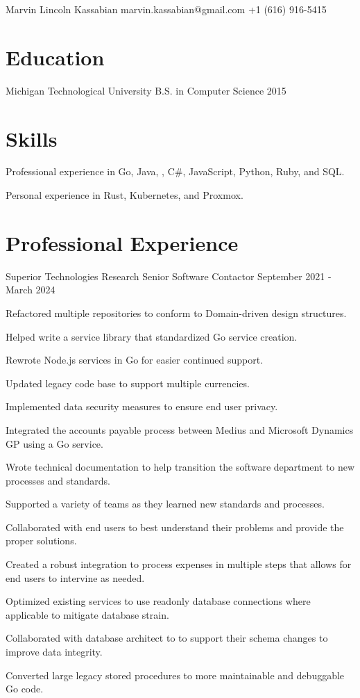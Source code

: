 \documentclass{marvinkassabian_resume}
\begin{document}
	\resumeheadersimple
			{Marvin Lincoln Kassabian}
			{marvin.kassabian@gmail.com}
			{+1 (616) 916-5415}

	\section{Education}
		\subsectionlocationdate
				{Michigan Technological University}
				{B.S. in Computer Science}
				{2015}

	\section{Skills}

		\resumesublistbegin
			\item Professional experience in Go, Java, \cpp, C\#, JavaScript, Python, Ruby, and SQL.
			\item Personal experience in Rust, Kubernetes, and Proxmox.
		\resumesublistend

	\section{Professional Experience}

		\subsectionpositiondate
				{Superior Technologies Research}
				{Senior Software Contactor}
				{September 2021 - March 2024}
		\resumesublistbegin
			\item Refactored multiple repositories to conform to Domain-driven design structures.
			\item Helped write a service library that standardized Go service creation.
			\item Rewrote Node.js services in Go for easier continued support.
			\item Updated legacy code base to support multiple currencies.
			\item Implemented data security measures to ensure end user privacy.
			\item Integrated the accounts payable process between Medius and Microsoft Dynamics GP using a Go service.
			\item Wrote technical documentation to help transition the software department to new processes and standards.
			\item Supported a variety of teams as they learned new standards and processes.
			\item Collaborated with end users to best understand their problems and provide the proper solutions.
			\item Created a robust integration to process expenses in multiple steps that allows for end users to intervine as needed.
			\item Optimized existing services to use readonly database connections where applicable to mitigate database strain.
			\item Collaborated with database architect to to support their schema changes to improve data integrity.
			\item Converted large legacy stored procedures to more maintainable and debuggable Go code.
		\resumesublistend
\end{document}
